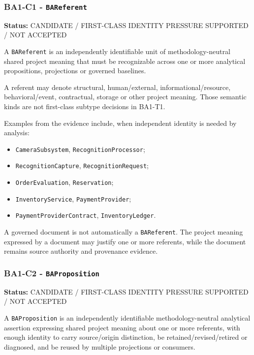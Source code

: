 \documentclass[
]{article}
\providecommand{\tightlist}{%
  \setlength{\itemsep}{0pt}\setlength{\parskip}{0pt}}
\begin{document}
\subsubsection{\texorpdfstring{BA1-C1 -
\texttt{BAReferent}}{BA1-C1 - BAReferent}}\label{ba1-c1---bareferent}

\textbf{Status:} CANDIDATE / FIRST-CLASS IDENTITY PRESSURE SUPPORTED /
NOT ACCEPTED

A \texttt{BAReferent} is an independently identifiable unit of
methodology-neutral shared project meaning that must be recognizable
across one or more analytical propositions, projections or governed
baselines.

A referent may denote structural, human/external,
informational/resource, behavioral/event, contractual, storage or other
project meaning. Those semantic kinds are not first-class subtype
decisions in BA1-T1.

Examples from the evidence include, when independent identity is needed
by analysis:

\begin{itemize}
\tightlist
\item
  \texttt{CameraSubsystem}, \texttt{RecognitionProcessor};
\item
  \texttt{RecognitionCapture}, \texttt{RecognitionRequest};
\item
  \texttt{OrderEvaluation}, \texttt{Reservation};
\item
  \texttt{InventoryService}, \texttt{PaymentProvider};
\item
  \texttt{PaymentProviderContract}, \texttt{InventoryLedger}.
\end{itemize}

A governed document is not automatically a \texttt{BAReferent}. The
project meaning expressed by a document may justify one or more
referents, while the document remains source authority and provenance
evidence.

\subsubsection{\texorpdfstring{BA1-C2 -
\texttt{BAProposition}}{BA1-C2 - BAProposition}}\label{ba1-c2---baproposition}

\textbf{Status:} CANDIDATE / FIRST-CLASS IDENTITY PRESSURE SUPPORTED /
NOT ACCEPTED

A \texttt{BAProposition} is an independently identifiable
methodology-neutral analytical assertion expressing shared project
meaning about one or more referents, with enough identity to carry
source/origin distinction, be retained/revised/retired or diagnosed, and
be reused by multiple projections or consumers.
\end{document}
